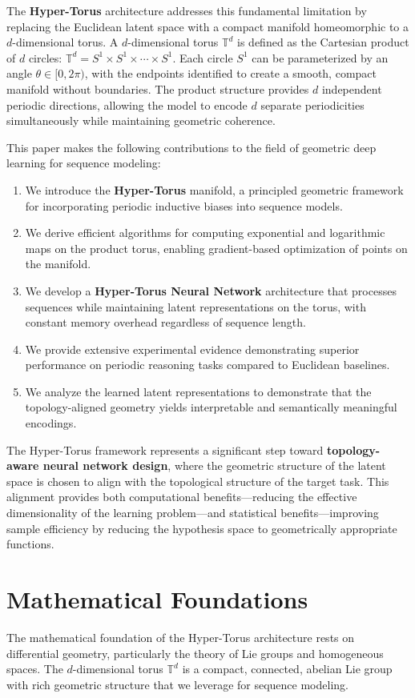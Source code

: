 \documentclass[12pt,letterpaper,twoside]{article}
\newcommand{\T}{\mathbb{T}}
\begin{document}
The \textbf{Hyper-Torus} architecture addresses this fundamental limitation by replacing the Euclidean latent space with a compact manifold homeomorphic to a $d$-dimensional torus. A $d$-dimensional torus $\T^d$ is defined as the Cartesian product of $d$ circles: $\T^d = S^1 \times S^1 \times \cdots \times S^1$. Each circle $S^1$ can be parameterized by an angle $\theta \in [0, 2\pi)$, with the endpoints identified to create a smooth, compact manifold without boundaries. The product structure provides $d$ independent periodic directions, allowing the model to encode $d$ separate periodicities simultaneously while maintaining geometric coherence.

This paper makes the following contributions to the field of geometric deep learning for sequence modeling:

\begin{enumerate}[label=(\roman*)]
    \item We introduce the \textbf{Hyper-Torus} manifold, a principled geometric framework for incorporating periodic inductive biases into sequence models.
    \item We derive efficient algorithms for computing exponential and logarithmic maps on the product torus, enabling gradient-based optimization of points on the manifold.
    \item We develop a \textbf{Hyper-Torus Neural Network} architecture that processes sequences while maintaining latent representations on the torus, with constant memory overhead regardless of sequence length.
    \item We provide extensive experimental evidence demonstrating superior performance on periodic reasoning tasks compared to Euclidean baselines.
    \item We analyze the learned latent representations to demonstrate that the topology-aligned geometry yields interpretable and semantically meaningful encodings.
\end{enumerate}

The Hyper-Torus framework represents a significant step toward \textbf{topology-aware neural network design}, where the geometric structure of the latent space is chosen to align with the topological structure of the target task. This alignment provides both computational benefits—reducing the effective dimensionality of the learning problem—and statistical benefits—improving sample efficiency by reducing the hypothesis space to geometrically appropriate functions.

\section{Mathematical Foundations}
The mathematical foundation of the Hyper-Torus architecture rests on differential geometry, particularly the theory of Lie groups and homogeneous spaces. The $d$-dimensional torus $\T^d$ is a compact, connected, abelian Lie group with rich geometric structure that we leverage for sequence modeling.
\end{document}

